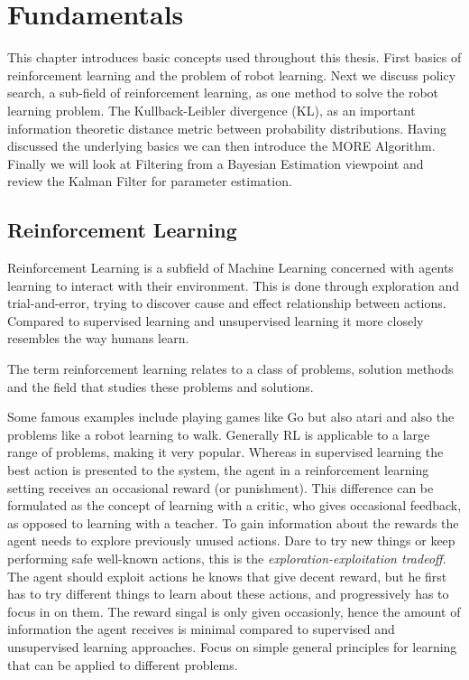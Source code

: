 
\chapter{Fundamentals}
This chapter introduces basic concepts used throughout this thesis.
First basics of reinforcement learning and the problem of robot learning.
Next we discuss policy search, a sub-field of reinforcement learning,
as one method to solve the robot learning problem.
The Kullback-Leibler divergence (KL), as an important information theoretic
distance metric between probability distributions.
Having discussed the underlying basics we can then introduce the MORE Algorithm.
Finally we will look at Filtering from a Bayesian Estimation viewpoint and
review the Kalman Filter for parameter estimation.


\section{Reinforcement Learning}
Reinforcement Learning is a subfield of Machine Learning concerned with agents
learning to interact with their environment.
This is done through exploration and trial-and-error, trying to discover
cause and effect relationship between actions.
Compared to supervised learning and unsupervised learning it
more closely resembles the way humans learn.

The term reinforcement learning relates to a class of problems, solution methods
and the field that studies these problems and solutions.
\citet{sutton2018reinforcement}

Some famous examples include playing games like Go but also atari
and also the problems like a robot learning to walk.
Generally RL is applicable to a large range of problems, making it very popular.
Whereas in supervised learning the best action is presented to the system,
the agent in a reinforcement learning setting receives an occasional
reward (or punishment).
This difference can be formulated as the concept
of learning with a critic, who gives occasional feedback, as opposed to learning
with a teacher.
To gain information about the rewards the agent needs
to explore previously unused actions. Dare to try new things or keep performing safe
well-known actions, this is the \textit{exploration-exploitation tradeoff}.
The agent should exploit actions he knows that give decent reward, but he first
has to try different things to learn about these actions, and progressively has to 
focus in on them.
The reward singal is only given occasionly, hence the amount of information
the agent receives is minimal compared to
supervised and unsupervised learning approaches.
Focus on simple general principles for learning that can be applied to different problems.

